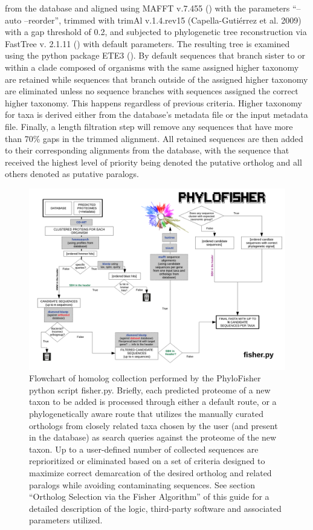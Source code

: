 \documentclass{article}
\begin{document}
from the database and aligned using MAFFT v.7.455 (\cite{katoh_mafft_2013}) with the parameters “--auto --reorder”, trimmed with trimAl v.1.4.rev15 (Capella-Gutiérrez et al. 2009) with a gap threshold of 0.2, and subjected to phylogenetic tree reconstruction via FastTree v. 2.1.11 (\cite{price_fasttree_2010}) with default parameters. The resulting tree is examined using the python package ETE3 (\cite{Huerta-Cepas}). By default sequences that branch sister to or within a clade composed of organisms with the same assigned higher taxonomy are retained while sequences that branch outside of the assigned higher taxonomy are eliminated unless no sequence branches with sequences assigned the correct higher taxonomy. This happens regardless of previous criteria. Higher taxonomy for taxa is derived either from the database’s metadata file or the input metadata file. Finally, a length filtration step will remove any sequences that have more than 70\% gaps in the trimmed alignment. All retained sequences are then added to their corresponding alignments from the database, with the sequence that received the highest level of priority being denoted the putative ortholog and all others denoted as putative paralogs.
        \begin{figure}[H]
            \centering
        	 \includegraphics[width=\linewidth]{figures/Figure2_fisher_algorithm.pdf}
        	 \caption{Flowchart of homolog collection performed by the PhyloFisher python script fisher.py. Briefly, each predicted proteome of a new taxon to be added is processed through either a default route, or a phylogenetically aware route that utilizes the manually curated orthologs from closely related taxa chosen by the user (and present in the database) as search queries against the proteome of the new taxon. Up to a user-defined number of collected sequences are reprioritized or eliminated based on a set of criteria designed to maximize correct demarcation of the desired ortholog and related paralogs while avoiding contaminating sequences. See section “Ortholog Selection via the Fisher Algorithm” of this guide for a detailed description of the logic, third-party software and associated parameters utilized.}
        	 \label{Fig:algorithm}
        \end{figure}
        
\end{document}
